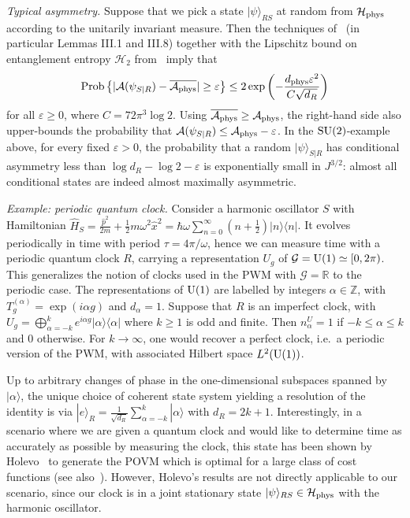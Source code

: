 \documentclass[aps,10pt,twocolumn,showpacs,pra,citeautoscript,amsmath,amssymb,floatfix,superscriptaddress]{revtex4-1}
\begin{document}
\emph{Typical asymmetry.} Suppose that we pick a state $|\psi\rangle_{RS}$ at random from $\mathcal{H}_{\rm phys}$ according to the unitarily invariant measure. Then the techniques of~\cite{HaydenLeungWinter} (in particular Lemmas III.1 and III.8) together with the Lipschitz bound on entanglement entropy $\mathcal{H}_2$ from~\cite{HaydenWinter}  imply that
\[
   {\rm Prob}\left\{|\mathcal{A}(\psi_{S|R})-\overline{\mathcal{A}_{\rm phys}}|\geq\varepsilon\right\}\leq 2\exp\left(-\frac{d_{\rm phys}\varepsilon^2}{C\sqrt{d_R}}\right)
\]
for all $\varepsilon\geq 0$, where $C=72\pi^3\log 2$. Using $\overline{\mathcal{A}_{\rm phys}}\geq \mathcal{A}_{\rm phys}$, the right-hand side also upper-bounds the probability that $\mathcal{A}(\psi_{S|R})\leq\mathcal{A}_{\rm phys}-\varepsilon$. In the ${\rm SU}(2)$-example above, for every fixed $\varepsilon>0$, the probability that a random $|\psi\rangle_{S|R}$ has conditional asymmetry less than $\log d_R-\log 2-\varepsilon$ is exponentially small in $J^{3/2}$: almost all conditional states are indeed almost maximally asymmetric.

\emph{Example: periodic quantum clock.} Consider a harmonic oscillator $S$ with Hamiltonian $\hat H_S=\frac{\hat p^2}{2m}+\frac 1 2 m \omega^2 \hat x^2=\hbar \omega \sum_{n=0}^\infty \left(n+\frac 1 2\right)|n\rangle\langle n|$. It evolves periodically in time with period $\tau=4\pi/\omega$, hence we can measure time with a periodic quantum clock $R$, carrying a representation $U_g$ of $\mathcal{G}={\rm U}(1)\simeq [0,2\pi)$. This generalizes the notion of clocks used in the PWM with $\mathcal{G}=\mathbb{R}$ to the periodic case. The representations of ${\rm U}(1)$ are labelled by integers $\alpha\in\mathbb{Z}$, with $T^{(\alpha)}_g=\exp(i\alpha g)$ and $d_\alpha=1$. Suppose that $R$ is an imperfect clock, with $U_g=\bigoplus_{\alpha=-k}^k e^{i\alpha g}|\alpha\rangle\langle\alpha|$ where $k\geq 1$ is odd and finite. Then $n_\alpha^U=1$ if $-k\leq \alpha\leq k$ and $0$ otherwise. For $k\to\infty$, one would recover a perfect clock, i.e.\ a periodic version of the PWM, with associated Hilbert space $L^2({\rm U}(1))$.

Up to arbitrary changes of phase in the one-dimensional subspaces spanned by $|\alpha\rangle$, the unique choice of coherent state system yielding a resolution of the identity is via $|e\rangle_R=\frac 1 {\sqrt{d_R}}\sum_{\alpha=-k}^k |\alpha\rangle$ with $d_R=2k+1$. Interestingly, in a scenario where we are given a quantum clock and would like to determine time as accurately as possible by measuring the clock, this state has been shown by Holevo~\cite{Holevo} to generate the POVM which is optimal for a large class of cost functions (see also~\cite{BuzekDerkaMassar}). However, Holevo's results are not directly applicable to our scenario, since our clock is in a joint stationary state $|\psi\rangle_{RS}\in\mathcal{H}_{\rm phys}$ with the harmonic oscillator.
\end{document}
